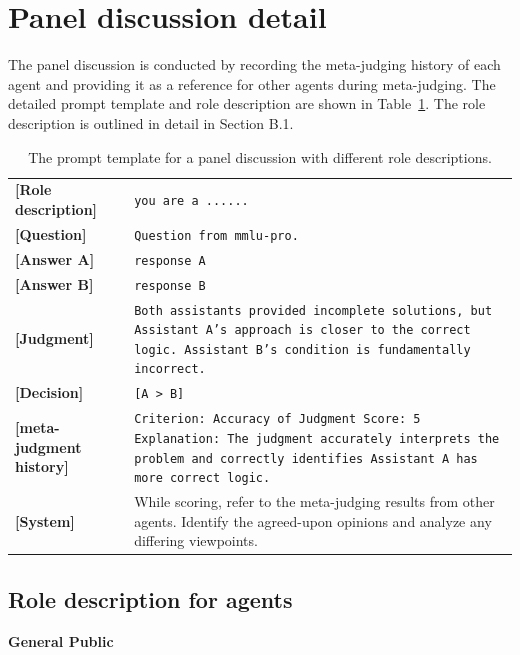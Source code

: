 \documentclass{article}
\theoremstyle{plain}
\theoremstyle{definition}
\theoremstyle{remark}
\begin{document}
\section{Panel discussion detail}
The panel discussion is conducted by recording the meta-judging history of each agent and providing it as a reference for other agents during meta-judging. The detailed prompt template and role description are shown in Table~\ref{table:template}. The role description is outlined in detail in Section B.1.

\begin{table}[h!]
\centering
\renewcommand{\arraystretch}{1.5} %
\setlength{\tabcolsep}{10pt} %
\begin{tabular}{@{}p{4cm}p{12cm}@{}} %
\textbf{[Role description]} & \texttt{you are a ......} \\ 
\textbf{[Question]} & \texttt{Question from mmlu-pro.} \\ 
\textbf{[Answer A]} & \texttt{response A} \\ 
\textbf{[Answer B]} & \texttt{response B} \\ 
\textbf{[Judgment]} & \texttt{Both assistants provided incomplete solutions, but Assistant A's approach is closer to the correct logic. Assistant B's condition is fundamentally incorrect.}\\ 
\textbf{[Decision]} & \texttt{[A > B]}\\ 
\textbf{[meta-judgment history]} & \texttt{Criterion: Accuracy of Judgment \newline
Score: 5  \newline
Explanation: The judgment accurately interprets the problem and correctly identifies Assistant A has more correct logic.}\\ 
\textbf{[System]} & 
While scoring, refer to the meta-judging results from other agents. Identify the agreed-upon opinions and analyze any differing viewpoints.\\ 
\end{tabular}
\caption{The prompt template for a panel discussion with different role descriptions.}
\label{table:template}
\end{table}

\subsection{Role description for agents}

\textbf{General Public}
\end{document}
